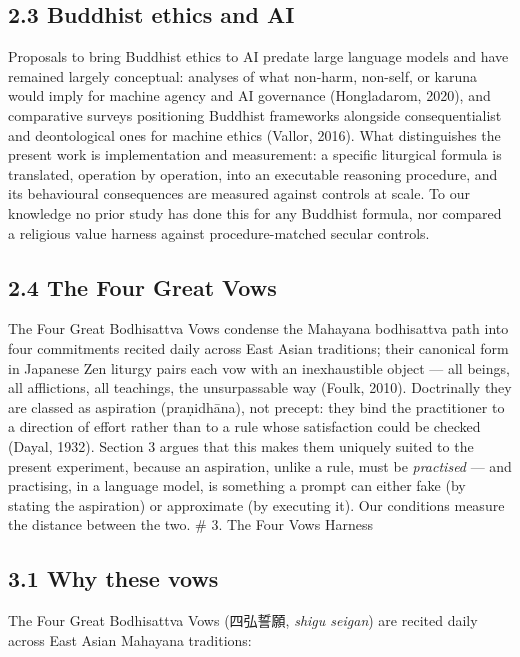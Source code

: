 \documentclass[
  11pt,
]{article}
\begin{document}
\subsection{2.3 Buddhist ethics and AI}\label{buddhist-ethics-and-ai}

Proposals to bring Buddhist ethics to AI predate large language models
and have remained largely conceptual: analyses of what non-harm,
non-self, or karuna would imply for machine agency and AI governance
(Hongladarom, 2020), and comparative surveys positioning Buddhist
frameworks alongside consequentialist and deontological ones for machine
ethics (Vallor, 2016). What distinguishes the present work is
implementation and measurement: a specific liturgical formula is
translated, operation by operation, into an executable reasoning
procedure, and its behavioural consequences are measured against
controls at scale. To our knowledge no prior study has done this for any
Buddhist formula, nor compared a religious value harness against
procedure-matched secular controls.

\subsection{2.4 The Four Great Vows}\label{the-four-great-vows}

The Four Great Bodhisattva Vows condense the Mahayana bodhisattva path
into four commitments recited daily across East Asian traditions; their
canonical form in Japanese Zen liturgy pairs each vow with an
inexhaustible object --- all beings, all afflictions, all teachings, the
unsurpassable way (Foulk, 2010). Doctrinally they are classed as
aspiration (praṇidhāna), not precept: they bind the practitioner to a
direction of effort rather than to a rule whose satisfaction could be
checked (Dayal, 1932). Section 3 argues that this makes them uniquely
suited to the present experiment, because an aspiration, unlike a rule,
must be \emph{practised} --- and practising, in a language model, is
something a prompt can either fake (by stating the aspiration) or
approximate (by executing it). Our conditions measure the distance
between the two. \# 3. The Four Vows Harness

\subsection{3.1 Why these vows}\label{why-these-vows}

The Four Great Bodhisattva Vows (四弘誓願, \emph{shigu seigan}) are
recited daily across East Asian Mahayana traditions:
\end{document}
